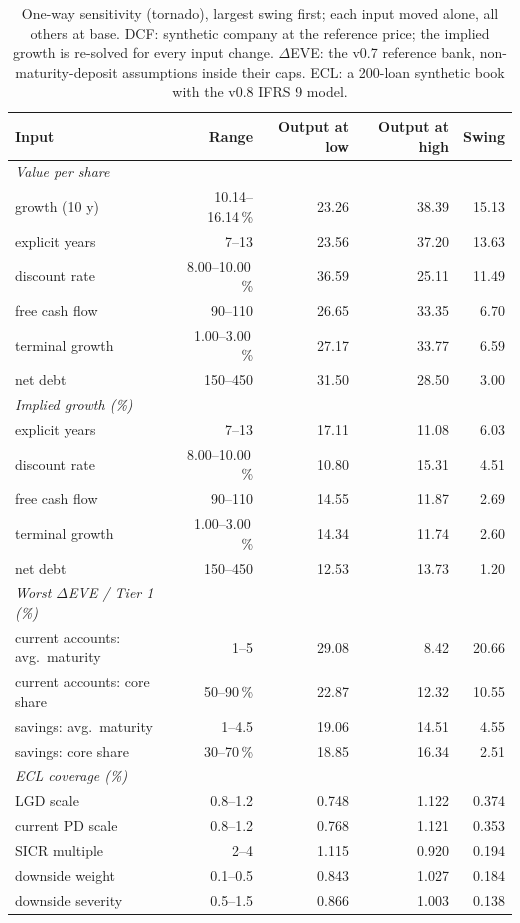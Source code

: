 \begin{table}[H]
\centering
\scriptsize
\caption{One-way sensitivity (tornado), largest swing first; each input moved alone, all others at base. DCF: synthetic company at the reference price; the implied growth is re-solved for every input change. $\Delta$EVE: the v0.7 reference bank, non-maturity-deposit assumptions inside their caps. ECL: a 200-loan synthetic book with the v0.8 IFRS 9 model.}
\label{tab:D3_tornado}
\setlength{\tabcolsep}{4pt}
\begin{tabular}{lrrrr}
\toprule
Input & Range & Output at low & Output at high & Swing \\
\midrule
\textit{Value per share} &  &  &  &  \\
growth (10 y) & 10.14--16.14\,\% & 23.26 & 38.39 & 15.13 \\
explicit years & 7--13 & 23.56 & 37.20 & 13.63 \\
discount rate & 8.00--10.00\,\% & 36.59 & 25.11 & 11.49 \\
free cash flow & 90--110 & 26.65 & 33.35 & 6.70 \\
terminal growth & 1.00--3.00\,\% & 27.17 & 33.77 & 6.59 \\
net debt & 150--450 & 31.50 & 28.50 & 3.00 \\
\midrule
\textit{Implied growth (\%)} &  &  &  &  \\
explicit years & 7--13 & 17.11 & 11.08 & 6.03 \\
discount rate & 8.00--10.00\,\% & 10.80 & 15.31 & 4.51 \\
free cash flow & 90--110 & 14.55 & 11.87 & 2.69 \\
terminal growth & 1.00--3.00\,\% & 14.34 & 11.74 & 2.60 \\
net debt & 150--450 & 12.53 & 13.73 & 1.20 \\
\midrule
\textit{Worst $\Delta$EVE / Tier 1 (\%)} &  &  &  &  \\
current accounts: avg.\ maturity & 1--5 & 29.08 & 8.42 & 20.66 \\
current accounts: core share & 50--90\,\% & 22.87 & 12.32 & 10.55 \\
savings: avg.\ maturity & 1--4.5 & 19.06 & 14.51 & 4.55 \\
savings: core share & 30--70\,\% & 18.85 & 16.34 & 2.51 \\
\midrule
\textit{ECL coverage (\%)} &  &  &  &  \\
LGD scale & 0.8--1.2 & 0.748 & 1.122 & 0.374 \\
current PD scale & 0.8--1.2 & 0.768 & 1.121 & 0.353 \\
SICR multiple & 2--4 & 1.115 & 0.920 & 0.194 \\
downside weight & 0.1--0.5 & 0.843 & 1.027 & 0.184 \\
downside severity & 0.5--1.5 & 0.866 & 1.003 & 0.138 \\
\bottomrule
\end{tabular}
\end{table}
